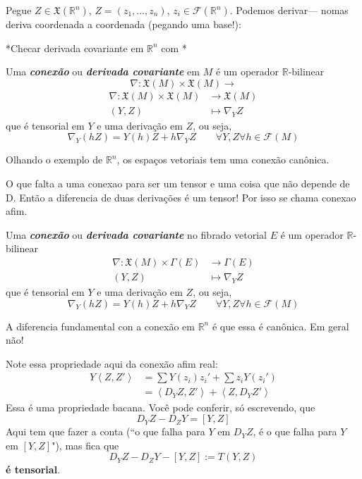 Pegue \(Z \in \mathfrak{X}(\mathbb{R}^n)\), \(Z=(z_1,\ldots,z_n)\), \(z_i \in \mathcal{F}(\mathbb{R}^n)\). Podemos derivar--- nomas deriva coordenada a coordenada {\color{7}(pegando uma  base!)}:

*Checar derivada covariante em \(\mathbb{R}^n\) com \cite{tud}*

\begin{defn}\leavevmode
Uma \textit{\textbf{conexão}} ou \textit{\textbf{derivada covariante}} em \(M\) é um operador \(\mathbb{R}\)-bilinear
\[\nabla:\mathfrak{X}(M) \times \mathfrak{X}(M) \longrightarrow \]
\begin{align*}
	\nabla: \mathfrak{X}(M) \times \mathfrak{X}(M) &\longrightarrow \mathfrak{X}(M) \\
	(Y,Z) &\longmapsto \nabla_YZ
\end{align*}
que é tensorial em \(Y\) e uma derivação em \(Z\), ou seja,
\[\nabla_Y(hZ)=Y(h)Z+h\nabla_YZ\qquad  \forall  Y,Z \forall h \in \mathcal{F}(M)\]
\end{defn}

Olhando o exemplo de \(\mathbb{R}^n\), os espaços vetoriais tem uma conexão canônica.

O que falta a uma conexao para ser um tensor e uma coisa que não depende de D. Então a diferencia de duas derivações é um tensor! Por isso se chama conexao afim.

\begin{defn}\leavevmode
Uma \textit{\textbf{conexão}} ou \textit{\textbf{derivada covariante}} no fibrado vetorial \(E\) é um operador \(\mathbb{R}\)-bilinear
\begin{align*}
	\nabla: \mathfrak{X}(M) \times \Gamma(E) &\longrightarrow \Gamma(E) \\
	(Y,Z) &\longmapsto \nabla_YZ
\end{align*}
que é tensorial em \(Y\) e uma derivação em \(Z\), ou seja,
\[\nabla_Y(hZ)=Y(h)Z+h\nabla_YZ\qquad  \forall  Y,Z \forall h \in \mathcal{F}(M)\]
\end{defn}

A diferencia fundamental con a conexão em \(\mathbb{R}^n\) é que essa é canônica. Em geral não!

Note essa propriedade aqui da conexão afim real:
\begin{align*}
Y\left<Z,Z'\right>&=\sum Y(z_i)z_i'+\sum z_i Y(z_i')\\
&=\left<D_YZ,Z'\right>+\left<Z,D_YZ'\right>
\end{align*}
Essa é uma propriedade bacana. Você pode conferir, só escrevendo, que
\[D_YZ-D_ZY=[Y,Z]\]
Aqui tem que fazer a conta (``o que falha para \(Y\) em  \(D_YZ\),  é o que falha para \(Y\) em \([Y,Z]\)"), mas fica que
\[D_YZ-D_ZY-[Y,Z]:=T(Y,Z)\]
\textbf{é tensorial}.

